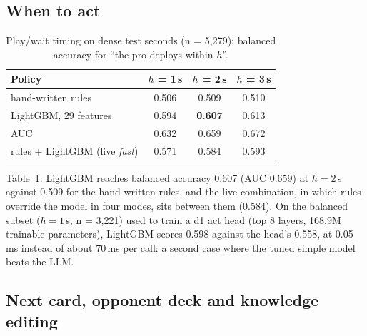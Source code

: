 \documentclass[conference]{IEEEtran}
\begin{document}
\subsection{When to act}

\begin{table}[t]
\caption{Play/wait timing on dense test seconds (n = 5,279): balanced accuracy for ``the pro deploys within $h$''.}
\label{tab:timing}
\centering\scriptsize
\setlength{\tabcolsep}{4pt}
\begin{tabular}{@{}lccc@{}}
\toprule
Policy & $h$ = 1\,s & $h$ = 2\,s & $h$ = 3\,s\\
\midrule
hand-written rules & 0.506 & 0.509 & 0.510\\
LightGBM, 29 features & 0.594 & \textbf{0.607} & 0.613\\
\quad AUC & 0.632 & 0.659 & 0.672\\
rules + LightGBM (live \emph{fast}) & 0.571 & 0.584 & 0.593\\
\bottomrule
\end{tabular}
\end{table}

Table~\ref{tab:timing}: LightGBM reaches balanced accuracy 0.607 (AUC 0.659) at $h=2$\,s against 0.509 for the hand-written rules, and the live combination, in which rules override the model in four modes, sits between them (0.584). On the balanced subset ($h=1$\,s, n = 3,221) used to train a d1 act head (top 8 layers, 168.9M trainable parameters), LightGBM scores 0.598 against the head's 0.558, at 0.05\,ms instead of about 70\,ms per call: a second case where the tuned simple model beats the LLM. %

\subsection{Next card, opponent deck and knowledge editing}
\end{document}
